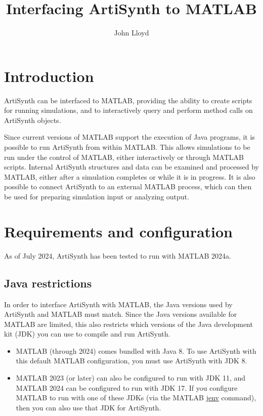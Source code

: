 \documentclass{article}
\title{Interfacing ArtiSynth to MATLAB}
\author{John Lloyd}
\date{}
\begin{document}
\maketitle

\iflatexml{\large\pubdate}\fi

\tableofcontents


\section{Introduction}

ArtiSynth can be interfaced to MATLAB, providing the ability to create
scripts for running simulations, and to interactively query and
perform method calls on ArtiSynth objects.

Since current versions of MATLAB support the execution of Java
programs, it is possible to run ArtiSynth from within MATLAB.  This
allows simulations to be run under the control of MATLAB, either
interactively or through MATLAB scripts. Internal ArtiSynth structures
and data can be examined and processed by MATLAB, either after a
simulation completes or while it is in progress. It is also possible
to connect ArtiSynth to an external MATLAB process, which can then be
used for preparing simulation input or analyzing output.

\section{Requirements and configuration}
\label{Requirements:sec}

As of July 2024, ArtiSynth has been tested to run with MATLAB 2024a.

\subsection{Java restrictions}

In order to interface ArtiSynth with MATLAB, the Java versions used by
ArtiSynth and MATLAB must match. Since the Java versions available for MATLAB
are limited, this also restricts which versions of the Java development kit
(JDK) you can use to compile and run ArtiSynth.

\begin{itemize}

\item MATLAB (through 2024) comes bundled with Java 8. To use ArtiSynth with
this default MATLAB configuration, you must use ArtiSynth with JDK 8.

\item MATLAB 2023 (or later) can also be configured to run with JDK 11, and
MATLAB 2024 can be configured to run with JDK 17. If you configure MATLAB to
run with one of these JDKs (via the MATLAB
\href{https://www.mathworks.com/help/matlab/ref/jenv.html}{jenv} command), then
you can also use that JDK for ArtiSynth.

\end{itemize}
\end{document}
